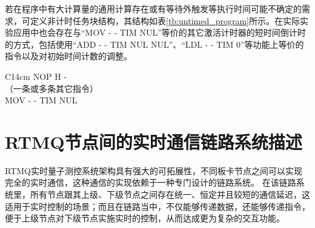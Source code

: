 若在程序中有大计算量的通用计算存在或有等待外触发等执行时间可能不确定的需求，可定义非计时任务块结构，其结构如表\ref{tb:untimed_program}所示。在实际实验应用中也会存在与“MOV - - TIM NUL”等价的其它激活计时器的短时间倒计时的方式，包括使用“ADD - - TIM NUL NUL”、“LDL - - TIM 0”等功能上等价的指令以及对初始时间计数的调整。

\begin{table}
    \centering
    \caption[非计时任务块结构]{非计时任务块结构\label{tb:untimed_program}}
    \begin{tabular}{C{14cm}}
        \toprule
        NOP H -\\
        （一条或多条其它指令）\\
        MOV - - TIM NUL \\
        \bottomrule
    \end{tabular}
\end{table}










\newpage
\section[RTMQ节点间的实时通信链路系统描述]{RTMQ节点间的实时通信链路系统描述\label{section:rtmq_links}}

RTMQ实时量子测控系统架构具有强大的可拓展性，不同板卡节点之间可以实现完全的实时通信，这种通信的实现依赖于一种专门设计的链路系统。
在该链路系统里，所有节点跟其上级、下级节点之间存在统一、恒定并且较短的通信延迟，这适用于实时控制的场景；而且在链路当中，不仅能够传递数据，还能够传递指令，便于上级节点对下级节点实施实时的控制，从而达成更为复杂的交互功能。

